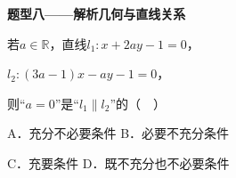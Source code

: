 \documentclass[12pt,a4paper]{article}
\newcommand{\qtitle}[1]{{\Large\bfseries\color[HTML]{1F3864}#1}\par\vspace{0.9em}}
\begin{document}
\qtitle{题型八——解析几何与直线关系}

若$a\in\mathbb{R}$，直线$l_1:x+2ay-1=0$，\par
$l_2:(3a-1)x-ay-1=0$，\par
则“$a=0$”是“$l_1\parallel l_2$”的（　）\par
\vspace{0.9em}
A．充分不必要条件 \qquad\qquad B．必要不充分条件\par
\vspace{0.45em}
C．充要条件 \qquad\qquad D．既不充分也不必要条件\par
\vspace{0.45em}
\end{document}
